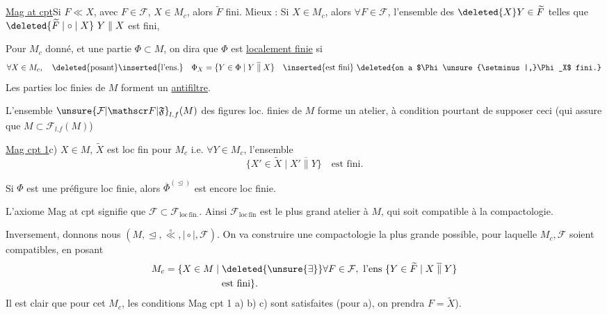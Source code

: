 
\uline{Mag at cpt}\quad Si $F\ll X$, avec $F\in\mathcal F$, $X\in M_c$, alors $\widetilde F$ fini. Mieux : Si $X\in M_c$, alors $\forall F\in\mathcal F$, l'ensemble des $\deleted{X}Y\in\widetilde F$ telles que $\deleted{\widetilde F\mathrel{\mid\circ\mid}X}\ Y\parallel X$ est fini,

Pour $M_c$ donné, et une partie $\Phi\subset M$, on dira que $\Phi$ est \uline{localement finie} si 
\[
\forall X\in M_c,\quad
\text{\deleted{posant}\inserted{l'ens.}}\quad
\Phi_X=\{Y\in\Phi\mid Y\mathrel{\overline{\parallel}}X\}
\quad\text{\inserted{est fini} \deleted{on a $\Phi\unsure{\setminus|,}\Phi_X$ fini.}}
\]
Les parties loc finies de $M$ forment un \uline{antifiltre}.

L'ensemble  $\unsure{\mathcal F|\mathscr F|\mathfrak F}_{l.f}(M)$ des figures loc. finies de $M$ forme un atelier, à condition pourtant de supposer  ceci (qui assure que $M\subset\mathcal F_{l.f}(M)$)

\uline{Mag cpt 1}\quad c)  $X\in M$, $\widetilde X$ est loc fin pour $M_c$ i.e. $\forall Y\in M_c$, l'ensemble 
\[
\{X'\in\widetilde X\mid X'\mathrel{\overline{\parallel}}Y\}\quad\text{est fini.}
\]

Si $\Phi$ est une préfigure loc finie, alors $\overline\Phi^{(\trianglelefteq)}$ est encore loc finie.

L'axiome Mag at cpt signifie que $\mathcal F\subset\mathcal F_{\mathrm{loc\,fin.}}$. Ainsi $\mathcal F_{\mathrm{loc\,fin}}$ est le plus grand atelier  à $M$, qui soit compatible à la compactologie.

Inversement, donnons nous $(M,\trianglelefteq,\overset{\circ}{\ll},\mathrel{\mid\circ\mid},\mathcal F)$. On va construire une  compactologie la plus grande possible, pour laquelle $M_c,\mathcal F$ soient compatibles, en posant
\[
\begin{aligned}
M_c=\{X\in M\mid {}&\deleted{\unsure{\exists}}\forall F\in\mathcal F,\ \text{l'ens }\{Y\in\widetilde F\mid X\mathrel{\overline{\parallel}}Y\}\\
&\text{est fini}\}.
\end{aligned}
\]
Il est clair que pour cet $M_c$, les conditions Mag cpt 1 a) b) c) sont satisfaites (pour a), on prendra $F=\widetilde X$).


